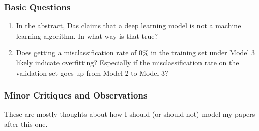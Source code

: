 \documentclass[11pt]{article}
\begin{document}
\begin{spacing}{1.2}
\subsubsection{Basic Questions}
\begin{enumerate}
	\item In the abstract, Das claims that a deep learning model is not a machine learning algorithm.  In what way is that true?
	\item Does getting a misclassification rate of 0\% in the training set under Model 3 likely indicate overfitting?  Especially if the misclassification rate on the validation set goes up from Model 2 to Model 3?
\end{enumerate}

\subsubsection{Minor Critiques and Observations}

These are mostly thoughts about how I should (or should not) model my papers after this one.  


\end{spacing}
\end{document}
